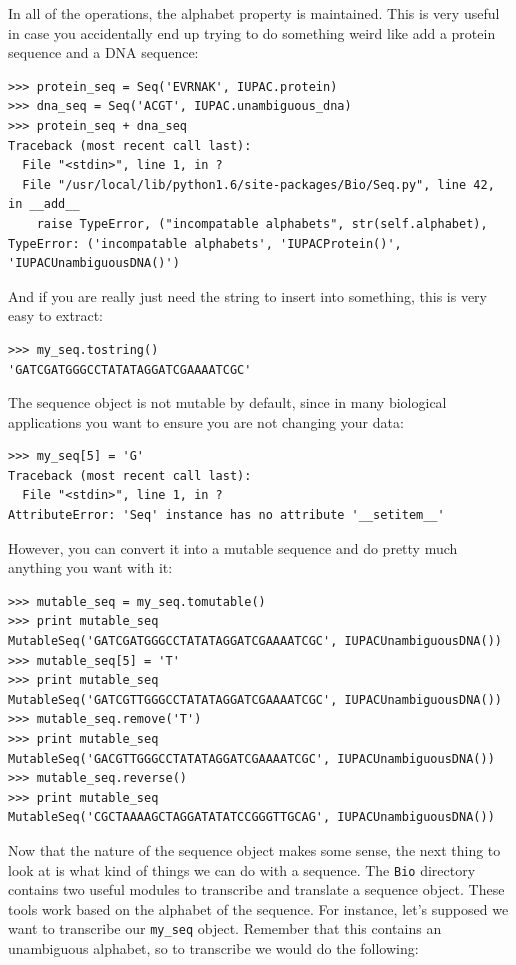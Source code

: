 \documentclass{report}
\begin{document}
In all of the operations, the alphabet property is maintained. This is very useful in case you accidentally end up trying to do something weird like add a protein sequence and a DNA sequence:

\begin{verbatim}
>>> protein_seq = Seq('EVRNAK', IUPAC.protein)
>>> dna_seq = Seq('ACGT', IUPAC.unambiguous_dna)
>>> protein_seq + dna_seq
Traceback (most recent call last):
  File "<stdin>", line 1, in ?
  File "/usr/local/lib/python1.6/site-packages/Bio/Seq.py", line 42, in __add__
    raise TypeError, ("incompatable alphabets", str(self.alphabet),
TypeError: ('incompatable alphabets', 'IUPACProtein()', 'IUPACUnambiguousDNA()')
\end{verbatim}


And if you are really just need the string to insert into something, this is very easy to extract:

\begin{verbatim}
>>> my_seq.tostring()
'GATCGATGGGCCTATATAGGATCGAAAATCGC'
\end{verbatim} 

The sequence object is not mutable by default, since in many biological applications you want to ensure you are not changing your data:

\begin{verbatim}
>>> my_seq[5] = 'G'
Traceback (most recent call last):
  File "<stdin>", line 1, in ?
AttributeError: 'Seq' instance has no attribute '__setitem__'
\end{verbatim}

However, you can convert it into a mutable sequence and do pretty much anything you want with it:

\begin{verbatim}
>>> mutable_seq = my_seq.tomutable()
>>> print mutable_seq
MutableSeq('GATCGATGGGCCTATATAGGATCGAAAATCGC', IUPACUnambiguousDNA())
>>> mutable_seq[5] = 'T'
>>> print mutable_seq
MutableSeq('GATCGTTGGGCCTATATAGGATCGAAAATCGC', IUPACUnambiguousDNA())
>>> mutable_seq.remove('T')
>>> print mutable_seq
MutableSeq('GACGTTGGGCCTATATAGGATCGAAAATCGC', IUPACUnambiguousDNA())
>>> mutable_seq.reverse()
>>> print mutable_seq
MutableSeq('CGCTAAAAGCTAGGATATATCCGGGTTGCAG', IUPACUnambiguousDNA())
\end{verbatim}

Now that the nature of the sequence object makes some sense, the next
thing to look at is what kind of things we can do with a sequence. The
\verb|Bio| directory contains two useful modules to transcribe and
translate a sequence object. These tools work based on the alphabet of
the sequence. For instance, let's supposed we want to transcribe our
\verb|my_seq| object. Remember that this contains an unambiguous
alphabet, so to transcribe we would do the following:
\end{document}
